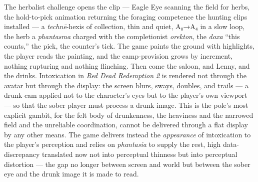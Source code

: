 \documentclass{article}
\begin{document}
The herbalist challenge opens the clip — Eagle Eye scanning the field for herbs, the hold-to-pick animation returning the foraging competence the hunting clips installed — a \textit{technē}-hexis of collection, thin and quiet, A₀→A₄ in a slow loop, the herb a \textit{phantasma} charged with the completionist \textit{orekton}, the \textit{doxa} ``this counts,'' the pick, the counter's tick. The game paints the ground with highlights, the player reads the painting, and the camp-provision grows by increment, nothing rupturing and nothing flinching. Then come the saloon, and Lenny, and the drinks. Intoxication in \textit{Red Dead Redemption 2} is rendered not through the avatar but through the display: the screen blurs, sways, doubles, and trails — a drunk-cam applied not to the character's eyes but to the player's own viewport — so that the sober player must process a drunk image. This is the pole's most explicit gambit, for the felt body of drunkenness, the heaviness and the narrowed field and the unreliable coordination, cannot be delivered through a flat display by any other means. The game delivers instead the \textit{appearance} of intoxication to the player's perception and relies on \textit{phantasia} to supply the rest, high data-discrepancy translated now not into perceptual thinness but into perceptual distortion — the gap no longer between screen and world but between the sober eye and the drunk image it is made to read.
\end{document}
